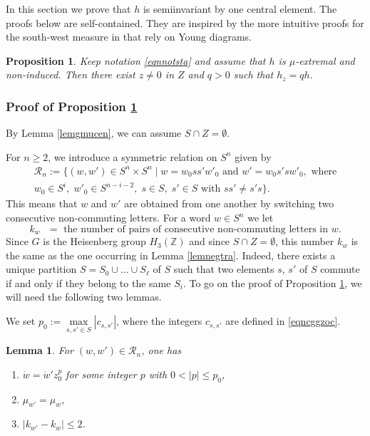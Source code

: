 \documentclass[11pt]{article}
\numberwithin{equation}{section}
\let\mathcal\mathscr
\newenvironment{enumeratei}
{\bgroup\def\theenumi{\roman{enumi}}\def\theenumii{\arabic{enumii}}\begin{enumerate}}
{\end{enumerate}\egroup}
\newtheorem{Prop}[Thm]{Proposition}
\newtheorem{Lem}[Thm]{Lemma}
\theoremstyle{definition}
\newcommand{\m}[1]{\mathbb{ #1}}
\newcommand{\mc}[1]{\mathcal{ #1}}
\let\bq\relax
\let\eq\relax
\begin{document}
\bq
In this section we prove that $h$
is semiinvariant by one central element.
The proofs below are self-contained.
They are inspired by the more intuitive
proofs for the south-west measure in \cite{BenoistHeisenberg1}
that rely on Young diagrams.
\eq

\begin{Prop}

\label{proseminv}
Keep notation \eqref{eqnnotsta} and
assume that $h$ is $\mu$-extremal and non-induced.
Then there exist $z\neq 0$ in $Z$ and $q>0$ such that $h_z=qh$.
\end{Prop}

\subsubsection*{Proof of Proposition \ref{proseminv}}
By Lemma \ref{lemgmucen}, we can assume $S\cap Z=\emptyset$.

For $n\geq 2$, we introduce a symmetric relation on $S^n$ given by
\begin{multline*}
\mc R_n:=\{ (w,w')\in S^n\times S^n \mid
w=w_0ss'w'_0\text{ and } w'=w_0s'sw'_0,\text{ where}\\
w_0\in S^i,\;w'_0\in S^{n-i-2},\; s\in S,\;s'\in S\text{ with } ss'\neq s's\}.
\end{multline*}
This means that $w$ and $w'$ are obtained from one another by switching two
consecutive non-commuting letters.
For a word $w\in S^n$ we let
\[
\text{$k_w$ $=$ the number of
pairs of consecutive non-commuting letters in $w$.}
\]
Since $G$ is the Heisenberg group $H_3(\m Z)$ and since $S\cap Z=\emptyset$,
this number
$k_w$ is the same as the one occurring in Lemma \ref{lemnegtra}.
Indeed, there exists a unique partition
$S=S_0\cup\ldots\cup S_\ell$ of $S$ such that two elements $s$, $s'$ of $S$
commute if and only if they belong to the same $S_i$.
To go on the proof of Proposition \ref{proseminv}, we will need the following two lemmas.

We set $p_0:=\max\limits_{s,s'\in S} |c_{s,s'}|$, where the integers $c_{s,s'}$
are defined in \eqref{eqncggzoc}.

\begin{Lem}
\label{lemkwkw}
For $(w,w')\in \mc R_n$, one has
\begin{enumeratei}
\item\label{lemkwkwi}
$\dot{w}=\dot{w}'z_0^p$ for some integer $p$ with $0<|p|\leq p_0$,
\item\label{lemkwkwii}
$\mu_{w'}=\mu_w$,
\item\label{lemkwkwiii}
$|k_{w'}-k_w|\leq 2$.
\end{enumeratei}
\end{Lem}
\end{document}
